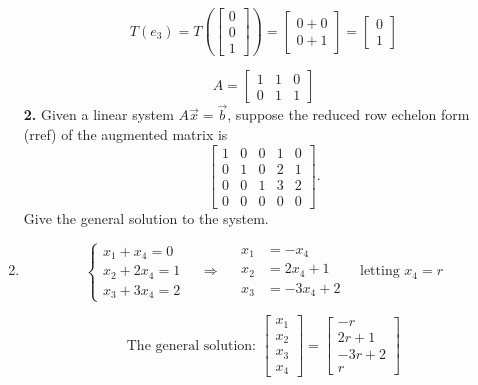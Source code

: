 \documentclass[8pt]{extarticle}
\begin{document}
\begin{multicols}{2}
\begin{tcolorbox}[title=Problem 1 — Original Statement and Solution]
\begin{enumerate}
\[
T(e_{3}) = T\!\left(\begin{bmatrix}0\\0\\1\end{bmatrix}\right)
= \begin{bmatrix}0+0\\0+1\end{bmatrix}
= \begin{bmatrix}0\\1\end{bmatrix}
\]

\[
A = \begin{bmatrix}
1 & 1 & 0\\
0 & 1 & 1
\end{bmatrix}
\]
\noindent
\textbf{2.} Given a linear system \(A\vec{x}=\vec{b}\), suppose the reduced row echelon form (rref) of the augmented matrix is
\[
\left[
\begin{array}{cccc|c}
1 & 0 & 0 & 1 & 0\\
0 & 1 & 0 & 2 & 1\\
0 & 0 & 1 & 3 & 2\\
0 & 0 & 0 & 0 & 0
\end{array}
\right].
\]
Give the general solution to the system.
\item
\[
\begin{cases}
x_{1} + x_{4} = 0\\
x_{2} + 2x_{4} = 1\\
x_{3} + 3x_{4} = 2
\end{cases}
\quad \Rightarrow \quad
\begin{aligned}
x_{1} &= -x_{4}\\
x_{2} &= 2x_{4}+1\\
x_{3} &= -3x_{4}+2
\end{aligned}
\quad \text{letting } x_{4} = r
\]

\[
\text{The general solution: } 
\begin{bmatrix}
x_{1}\\
x_{2}\\
x_{3}\\
x_{4}
\end{bmatrix}
=
\begin{bmatrix}
-r\\
2r+1\\
-3r+2\\
r
\end{bmatrix}
\]
\end{enumerate}
\end{tcolorbox}


\end{multicols}
\end{document}
